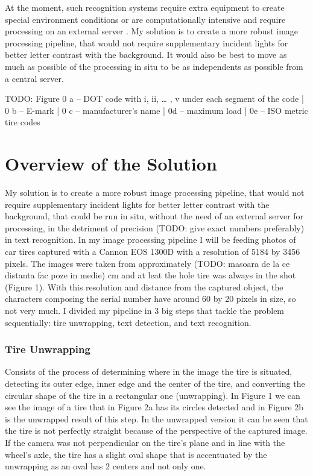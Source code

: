 At the moment, such recognition systems require extra equipment to create special environment conditions \cite{article:1} or are computationally intensive and require processing on an external server \cite{site:0}. My solution is to create a more robust image processing pipeline, that would not require supplementary incident lights for better letter contrast with the background. It would also be best to move as much as possible of the processing in situ to be as independents as possible from a central server.

TODO: Figure 0 a -- DOT code with i, ii, … , v under each segment of the code | 0 b -- E-mark | 0 c -- manufacturer's name | 0d -- maximum load | 0e -- ISO metric tire codes

\section{Overview of the Solution}

My solution is to create a more robust image processing pipeline, that would not require supplementary incident lights for better letter contrast with the background, that could be run in situ, without the need of an external server for processing, in the detriment of precision (TODO: give exact numbers preferably) in text recognition. In my image processing pipeline I will be feeding photos of car tires captured with a Cannon EOS 1300D with a resolution of 5184 by 3456 pixels. The images were taken from approximately (TODO: masoara de la ce distanta fac poze in medie) cm and at leat the hole tire was always in the shot (Figure 1). With this resolution and distance from the captured object, the characters composing the serial number have around 60 by 20 pixels in size, so not very much. I divided my pipeline in 3 big steps that tackle the problem sequentially: tire unwrapping, text detection, and text recognition.

\subsubsection{Tire Unwrapping}

Consists of the process of determining where in the image the tire is situated, detecting its outer edge, inner edge and the center of the tire, and converting the circular shape of the tire in a rectangular one (unwrapping). In Figure 1 we can see the image of a tire that in Figure 2a has its circles detected and in Figure 2b is the unwrapped result of this step. In the unwrapped version it can be seen that the tire is not perfectly straight because of the perspective of the captured image. If the camera was not perpendicular on the tire's plane and in line with the wheel's axle, the tire has a slight oval shape that is accentuated by the unwrapping as an oval has 2 centers and not only one.

